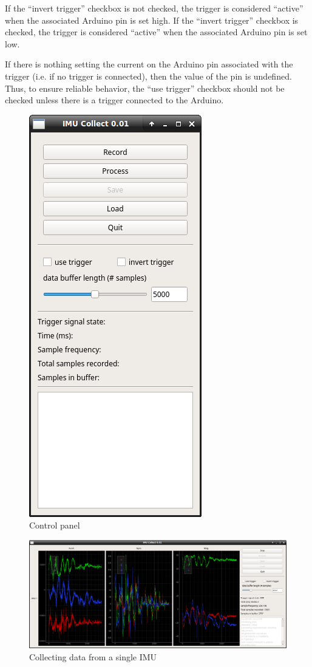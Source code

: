 \documentclass[11pt,letterpaper,article]{memoir}
\begin{document}
If the ``invert trigger'' checkbox is not checked, the trigger is considered
``active'' when the associated Arduino pin is set high. If the ``invert
trigger'' checkbox is checked, the trigger is considered ``active'' when the
associated Arduino pin is set low.

If there is nothing setting the current on the Arduino pin associated with the
trigger (i.e. if no trigger is connected), then the value of the pin is
undefined.  Thus, to ensure reliable behavior, the ``use trigger'' checkbox
should not be checked unless there is a trigger connected to the Arduino.

\begin{figure}[]
    \begin{center}
        \includegraphics[width=.45\textwidth]{screenshot_0_imu}
    \end{center}
    \caption{Control panel} 
\end{figure}

\begin{figure}[]
    \begin{center}
        \includegraphics[width=.45\textwidth]{screenshot_1_imu}
    \end{center}
    \caption{Collecting data from a single IMU} 
\end{figure}
\end{document}

